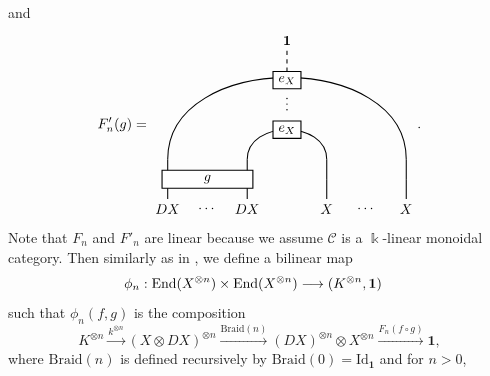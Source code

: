 \documentclass[11pt, reqno]{amsart}
\theoremstyle{definition}\newtheorem{defi}[thm]{Definition}
\theoremstyle{definition}\newtheorem{rem}[thm]{Remark}
\theoremstyle{definition}\newtheorem{exam}[thm]{Example}
\theoremstyle{definition}\newtheorem{assum}[thm]{Assumption}
\newcommand{\cC}{\mathcal{C}}
\newcommand{\Id}{\mathrm{Id}}
\newcommand{\vac}{\mathbf{1}}
\let\hom\relax
\DeclareMathOperator{\hom}{Hom}
\begin{document}
   and
   \begin{equation*}
F'_n(g) =
 \begin{matrix}
    \begin{tikzpicture}[scale = 1, baseline = {(current bounding box.center)}, line width=0.75pt]
        \draw (0,3.25) -- (0,3.75);
        \draw (2,3.25) -- (2,3.75);
        \draw (4,3.25) -- (4,3.75);
        \draw (6,3.25) -- (6,3.75);
        \draw (0,3.75) -- (0,4.25);
        \draw (2,3.75) -- (2,4.25);
        \draw (4,3.75) -- (4,4.25);
        \draw (6,3.75) -- (6,4.25);
        \draw (2,4.25) .. controls (2,5.25) and (4,5.25) .. (4,4.25);
        \draw (0,4.25) .. controls (0,7) and (6,7) .. (6,4.25);
        \draw[dashed] (3,6.25) -- (3,7);
\node at (0,3) {$DX$};
\node at (1,3) {$\cdots$};
\node at (2,3) {$DX$};
\node at (4,3) {$X$};
\node at (5,3) {$\cdots$};
\node at (6,3) {$X$};
\node at (3,5.75) {$\vdots$};
\node at (3,7.25) {$\vac$};
      \node at (1,3.75) [draw,minimum width=65pt,minimum height=10pt,thick, fill=white] {$g$};
      \node at (3,5) [draw,minimum width=20pt,minimum height=10pt,thick, fill=white] {$e_X$};
      \node at (3,6.25) [draw,minimum width=20pt,minimum height=10pt,thick, fill=white] {$e_X$};
        \end{tikzpicture}
   \end{matrix}.
\end{equation*}
Note that $F_n$ and $F'_n$ are linear because we assume $\cC$ is a $\Bbbk$-linear monoidal category.
Then similarly as in \cite[Section 2.2]{EP}, we define a bilinear map
\begin{align*}
\phi_n: \mathrm{End}(X^{\otimes n})\times\mathrm{End}(X^{\otimes n}) & \longrightarrow\hom(K^{\otimes n},\vac)
\end{align*}
such that $\phi_n(f,g)$ is the composition
\begin{equation*}
K^{\otimes n}\xrightarrow{k^{\otimes n}} (X\otimes DX)^{\otimes n}\xrightarrow{\mathrm{Braid}(n)} (DX)^{\otimes n}\otimes X^{\otimes n}\xrightarrow{F_n(f\circ g)} \vac,
\end{equation*}
where 
$\mathrm{Braid}(n)$ is defined recursively by $\mathrm{Braid}(0)=\Id_\vac$ and for $n>0$,
\end{document}
